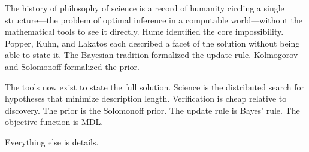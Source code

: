 The history of philosophy of science is a record of humanity circling a single structure---the problem of optimal inference in a computable world---without the mathematical tools to see it directly. Hume identified the core impossibility. Popper, Kuhn, and Lakatos each described a facet of the solution without being able to state it. The Bayesian tradition formalized the update rule. Kolmogorov and Solomonoff formalized the prior.

The tools now exist to state the full solution. Science is the distributed search for hypotheses that minimize description length. Verification is cheap relative to discovery. The prior is the Solomonoff prior. The update rule is Bayes' rule. The objective function is MDL.

Everything else is details.